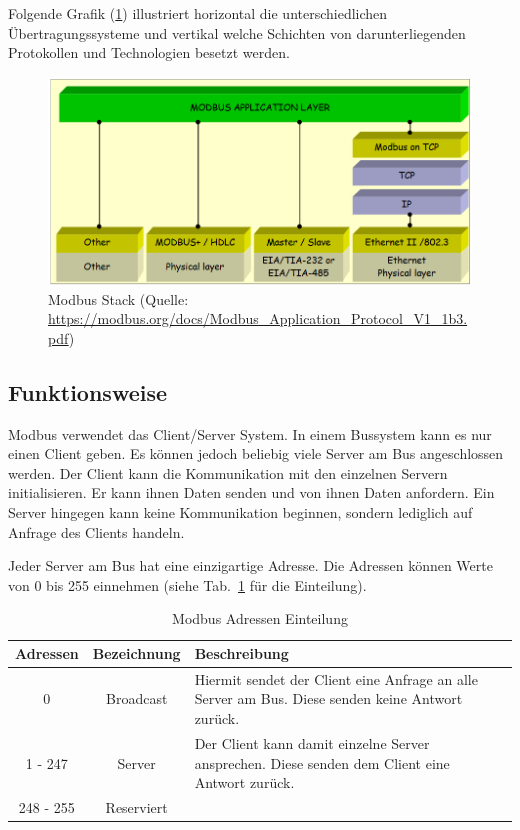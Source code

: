 Folgende Grafik (\ref{fig:modbus_stack}) illustriert horizontal die unterschiedlichen Übertragungssysteme und vertikal welche Schichten von darunterliegenden Protokollen und Technologien besetzt werden.
\begin{figure}[H]
	\centering
	\includegraphics[width=1.0\linewidth]{Bilder/Modbus_layers}
	\caption{Modbus Stack (Quelle: \url{https://modbus.org/docs/Modbus_Application_Protocol_V1_1b3.pdf})}
	\label{fig:modbus_stack}
\end{figure}

\subsection{Funktionsweise} \label{modbus_funktionsweise}
Modbus verwendet das Client/Server System. In einem Bussystem kann es nur einen Client geben. Es können jedoch beliebig viele Server am Bus angeschlossen werden. Der Client kann die Kommunikation mit den einzelnen Servern initialisieren. Er kann ihnen Daten senden und von ihnen Daten anfordern. Ein Server hingegen kann keine Kommunikation beginnen, sondern lediglich auf Anfrage des Clients handeln.

Jeder Server am Bus hat eine einzigartige Adresse. Die Adressen können Werte von 0 bis 255 einnehmen (siehe Tab.~\ref{tab:modbus_adressen} für die Einteilung). 
\begin{table}[h]
	\caption{Modbus Adressen Einteilung \label{tab:modbus_adressen}}
	\begin{tabularx}{\textwidth}{@{}c|c|X@{}}
		\toprule
		\textbf{Adressen} & \textbf{Bezeichnung} & \textbf{Beschreibung} \\
		\midrule
		0 & Broadcast & Hiermit sendet der Client eine Anfrage an alle Server am Bus. Diese senden keine Antwort zurück. \\
		1 - 247 & Server & Der Client kann damit einzelne Server ansprechen. Diese senden dem Client eine Antwort zurück. \\
		248 - 255 & Reserviert & \\
		\bottomrule
	\end{tabularx}
\end{table}

